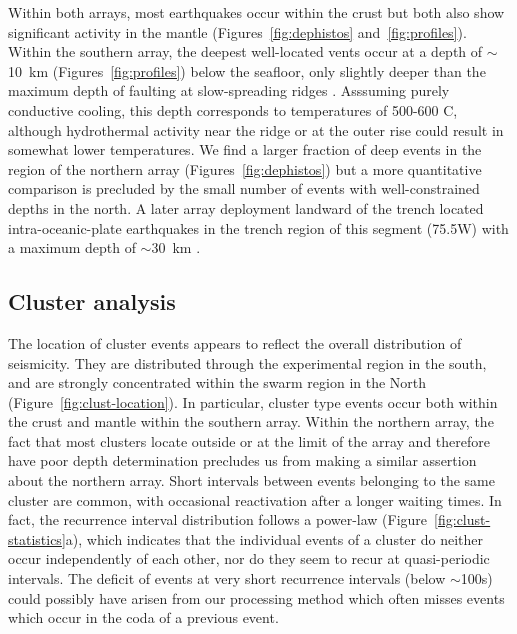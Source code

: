 \documentclass[reviewcopy]{elsart}
\begin{document}
Within both arrays, most earthquakes occur within the crust but both
also show significant activity in the mantle
(Figures~\ref{fig:dephistos} and~\ref{fig:profiles}). Within the southern array, the deepest
well-located vents occur at a depth of
$\sim$10~km (Figures~\ref{fig:profiles}) below the seafloor, only slightly deeper than the
maximum depth of faulting at slow-spreading ridges
\citep[e.g.][]{toomey88,tilmann04}.  Asssuming purely conductive
cooling, this depth corresponds to temperatures of 500-600\dg
C, although hydrothermal activity  near the ridge or at the outer rise
could result in somewhat lower
 temperatures.  We find a
larger fraction of deep events in the region of the northern array
(Figures~\ref{fig:dephistos}) but
a more quantitative comparison is precluded by the small number of
events with well-constrained depths in the north. A later array
deployment landward of the trench located intra-oceanic-plate
earthquakes in the trench region of this segment (75.5\dg W) with a maximum depth of
$\sim$30~km \citep{lange07}. 

\subsection{Cluster analysis}

The location of cluster events appears to reflect the overall
distribution of seismicity.  They are distributed through the
experimental region in the south, and are strongly concentrated within
the swarm region in the North (Figure~\ref{fig:clust-location}).  In
particular, cluster type events occur both within the crust and mantle
within the southern array.  Within the northern array, the fact that
most clusters locate outside or at the limit of the array and therefore
have poor depth determination precludes us from making a similar
assertion about the northern array.   Short intervals between events
belonging to the same cluster are common, with occasional reactivation
after a longer waiting times.  In fact, the recurrence interval
distribution follows a power-law (Figure~\ref{fig:clust-statistics}a),
which indicates that the individual events of a cluster do neither occur
independently of each other, nor do they seem to recur at
quasi-periodic intervals.  The deficit of events at very short
recurrence intervals (below $\sim$100s) could possibly have arisen from our
processing method which often  misses events which occur in the
coda of a previous event.
\end{document}
